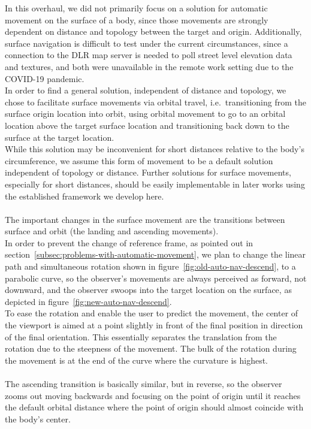 In this overhaul, we did not primarily focus on a solution for automatic movement on the surface of a body, since
those movements are strongly dependent on distance and topology between the target and origin.
Additionally, surface navigation is difficult to test under the current circumstances, since a connection to the DLR
map server is needed to poll street level elevation data and textures, and both were unavailable in the remote work
setting due to the COVID-19 pandemic.
\\
In order to find a general solution, independent of distance and topology, we chose to facilitate surface movements
via orbital travel, i.e.\ transitioning from the surface origin location into orbit, using orbital movement to go to an
orbital location above the target surface location and transitioning back down to the surface at the target location.
\\
While this solution may be inconvenient for short distances relative to the body's circumference, we assume this form
of movement to be a default solution independent of topology or distance.
Further solutions for surface movements, especially for short distances, should be easily implementable in later
works using the established framework we develop here.
\\
\\
The important changes in the surface movement are the transitions between surface and orbit (the landing and
ascending movements).
\\
In order to prevent the change of reference frame, as pointed out in
section~\ref{subsec:problems-with-automatic-movement}, we plan to change the linear path and simultaneous rotation
shown in figure~\ref{fig:old-auto-nav-descend}, to a parabolic curve, so the observer's movements are always
perceived as forward, not downward, and the observer swoops into the target location on the surface, as depicted in
figure~\ref{fig:new-auto-nav-descend}.
\\
To ease the rotation and enable the user to predict the movement, the center of the viewport is aimed at a point
slightly in front of the final position in direction of the final orientation.
This essentially separates the translation from the rotation due to the steepness of the movement.
The bulk of the rotation during the movement is at the end of the curve where the curvature is highest.
\\
\\
The ascending transition is basically similar, but in reverse, so the observer zooms out moving backwards and
focusing on the point of origin until it reaches the default orbital distance where the point of origin should almost
coincide with the body's center.

